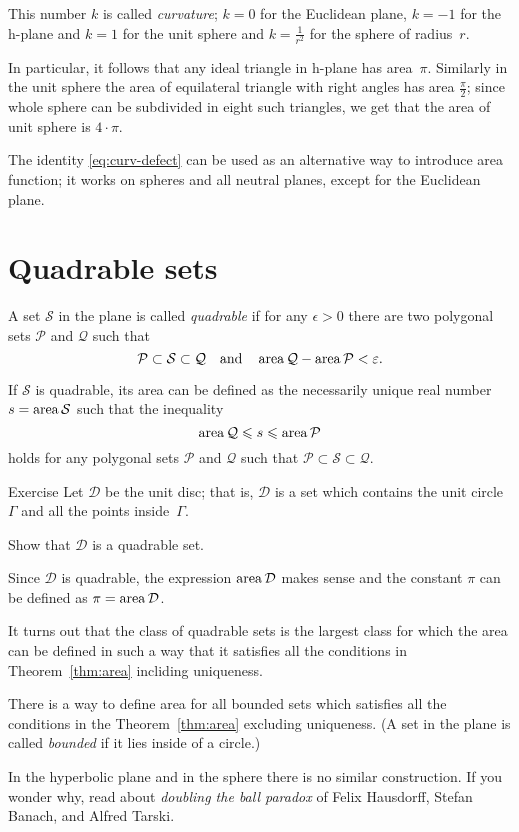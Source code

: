 This number $k$ is called \emph{curvature};
$k=0$ for the Euclidean plane,
$k=-1$ for the h-plane and $k=1$ for the unit sphere
and $k=\tfrac1{r^2}$ for the sphere of radius~$r$.

In particular, it follows that any ideal triangle in h-plane has area~$\pi$.
Similarly in the unit sphere the area of equilateral triangle with right angles has area $\tfrac\pi2$;
since whole sphere can be subdivided in eight such triangles, we get that the area of unit sphere is $4\cdot\pi$.

The identity \ref{eq:curv-defect} can be used as an alternative way to introduce area function; it works on spheres and all neutral planes, except for the Euclidean plane.

\section*{Quadrable sets}

A set $\mathcal{S}$ 
in the plane is called \emph{quadrable}
if for any $\epsilon>0$ there are two polygonal sets 
$\mathcal{P}$ and $\mathcal{Q}$
such that 
\[\mathcal{P}
\subset
\mathcal{S}\subset\mathcal{Q}
\quad
\text{and}
\quad
\mathop{\rm area}\nolimits\mathcal{Q}-\mathop{\rm area}\nolimits\mathcal{P}
<
\varepsilon.\]

If $\mathcal{S}$ is quadrable,
its area  can be defined 
as the necessarily unique real number $s=\mathop{\rm area}\nolimits\mathcal{S}$
such that the inequality
\[\mathop{\rm area}\nolimits\mathcal{Q}\leqslant s\leqslant \mathop{\rm area}\nolimits\mathcal{P}
\]
holds for any polygonal sets $\mathcal{P}$ and $\mathcal{Q}$ such that $\mathcal{P}\subset\mathcal{S}\subset\mathcal{Q}$.

\begin{thm}{Exercise}\label{ex:circle-is-quadrable}
Let $\mathcal{D}$ be the unit disc;
that is, $\mathcal{D}$ is a set which contains 
the unit circle $\Gamma$ and all the points inside~$\Gamma$.

Show that $\mathcal{D}$ is a quadrable set.
\end{thm}

Since $\mathcal{D}$ is quadrable, the expression $\mathop{\rm area}\nolimits\mathcal{D}$ makes sense and the constant $\pi$ can be defined as $\pi=\mathop{\rm area}\nolimits\mathcal{D}$.

\medskip

It turns out that the class of quadrable sets is the largest class for which 
the area can be defined in such a way that it satisfies all the conditions in Theorem~\ref{thm:area} incliding uniqueness.

There is a way to define area for all bounded sets
which satisfies all the conditions in the Theorem~\ref{thm:area} excluding uniqueness.
(A set in the plane is called \emph{bounded} if it lies inside of a circle.)

In the hyperbolic plane and in the sphere
there is no similar construction.
If you wonder why,
read about \emph{doubling the ball paradox} of Felix Hausdorff, Stefan Banach, and Alfred Tarski.

